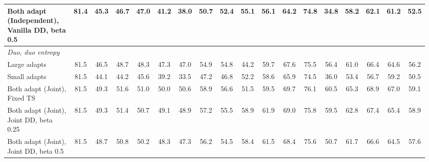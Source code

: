 \begin{table}[t]
{\begin{tabular}{l|c|ccc|cccc|cccc|cccc|c}
        \quad Both adapt (Independent), Vanilla DD, beta 0.5 & 81.4 & 45.3 & 46.7 & 47.0 & 41.2 & 38.0 & 50.7 & 52.4 & 55.1 & 56.1 & 64.2 & 74.8 & 34.8 & 58.2 & 62.1 & 61.2 & 52.5 \\
        \midrule
        \multicolumn{18}{l}{\textit{Duo, duo entropy}} \\
        \quad Large adapts & 81.5 & 46.5 & 48.7 & 48.3 & 47.3 & 47.0 & 54.9 & 54.8 & 44.2 & 59.7 & 67.6 & 75.5 & 56.4 & 61.0 & 66.4 & 64.6 & 56.2 \\
        \quad Small adapts & 81.5 & 44.1 & 44.2 & 45.6 & 39.2 & 33.5 & 47.2 & 46.8 & 52.2 & 58.6 & 65.9 & 74.5 & 36.0 & 53.4 & 56.7 & 59.2 & 50.5 \\
        \quad Both adapt (Joint), Fixed TS & 81.5 & 49.3 & 51.6 & 51.0 & 50.0 & 50.6 & 58.9 & 56.6 & 51.5 & 59.5 & 69.7 & 76.1 & 60.5 & 65.3 & 68.9 & 67.0 & 59.1 \\
        \quad Both adapt (Joint), Joint DD, beta 0.25 & 81.5 & 49.3 & 51.4 & 50.7 & 49.1 & 48.9 & 57.2 & 55.5 & 58.9 & 61.9 & 69.0 & 75.8 & 59.5 & 62.8 & 67.4 & 65.4 & 58.9 \\
        \quad Both adapt (Joint), Joint DD, beta 0.5 & 81.5 & 48.7 & 50.8 & 50.2 & 48.3 & 47.3 & 56.2 & 54.5 & 58.4 & 61.5 & 68.4 & 75.6 & 50.7 & 61.7 & 66.6 & 64.5 & 57.6 \\
        \bottomrule
    \end{tabular}%
    }
\end{table}
